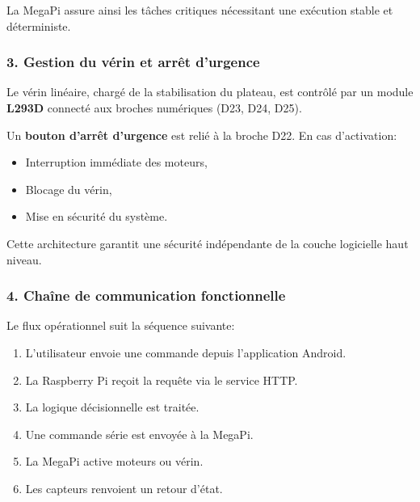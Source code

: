 \documentclass[12pt,a4paper]{article}
\begin{document}
La MegaPi assure ainsi les tâches critiques nécessitant
une exécution stable et déterministe.

\subsubsection*{3. Gestion du vérin et arrêt d’urgence}

Le vérin linéaire, chargé de la stabilisation du plateau,
est contrôlé par un module \textbf{L293D}
connecté aux broches numériques (D23, D24, D25).

Un \textbf{bouton d’arrêt d’urgence} est relié à la broche D22.
En cas d’activation:

\begin{itemize}
    \item Interruption immédiate des moteurs,
    \item Blocage du vérin,
    \item Mise en sécurité du système.
\end{itemize}

Cette architecture garantit une sécurité indépendante
de la couche logicielle haut niveau.

\subsubsection*{4. Chaîne de communication fonctionnelle}

Le flux opérationnel suit la séquence suivante:

\begin{enumerate}
    \item L’utilisateur envoie une commande depuis l’application Android.
    \item La Raspberry Pi reçoit la requête via le service HTTP.
    \item La logique décisionnelle est traitée.
    \item Une commande série est envoyée à la MegaPi.
    \item La MegaPi active moteurs ou vérin.
    \item Les capteurs renvoient un retour d’état.
\end{enumerate}
\end{document}
